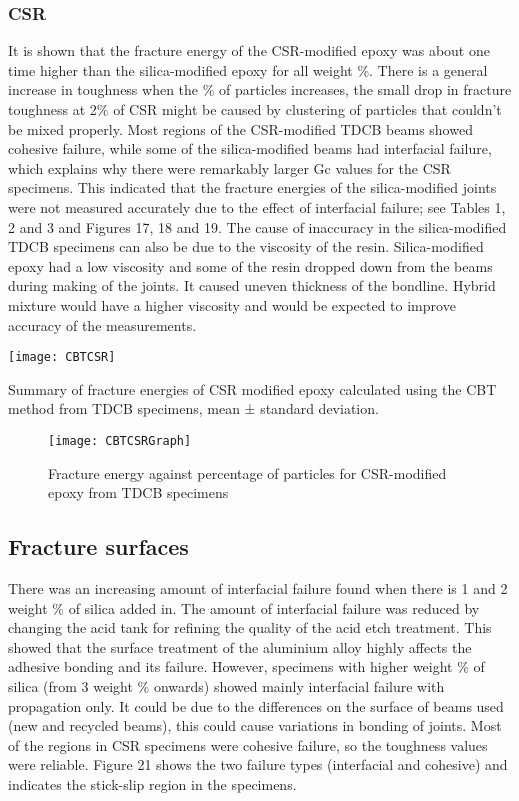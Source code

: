 \documentclass[numbers=noendperiod,chapterprefix=on]{icldt} %
\begin{document}
\subsubsection{CSR}
It is shown that the fracture energy of the CSR-modified epoxy was about one time higher than the silica-modified epoxy for all weight \%. There is a general increase in toughness when the \% of particles increases, the small drop in fracture toughness at 2\% of CSR might be caused by clustering of particles that couldn’t be mixed properly. Most regions of the CSR-modified TDCB beams showed cohesive failure, while some of the silica-modified beams had interfacial failure, which explains why there were remarkably larger Gc values for the CSR specimens. This indicated that the fracture energies of the silica-modified joints were not measured accurately due to the effect of interfacial failure; see Tables 1, 2 and 3 and Figures 17, 18 and 19.
The cause of inaccuracy in the silica-modified TDCB specimens can also be due to the viscosity of the resin. Silica-modified epoxy had a low viscosity and some of the resin dropped down from the beams during making of the joints. It caused uneven thickness of the bondline. Hybrid mixture would have a higher viscosity and would be expected to improve accuracy of the measurements.

\begin{table}[!htpb]
\centering
\texttt{[image: CBTCSR]}
\caption{Summary of fracture energies of CSR modified epoxy calculated using the CBT method from TDCB specimens, mean ± standard deviation. } %
\end{table}

\begin{figure}[!htpb]
\centering
\texttt{[image: CBTCSRGraph]}
\caption{Fracture energy against percentage of particles for CSR-modified epoxy from TDCB specimens} %
\end{figure}

\subsection{Fracture surfaces}
There was an increasing amount of interfacial failure found when there is 1 and 2 weight \% of silica added in. The amount of interfacial failure was reduced by changing the acid tank for refining the quality of the acid etch treatment. This showed that the surface treatment of the aluminium alloy highly affects the adhesive bonding and its failure. However, specimens with higher weight \% of silica (from 3 weight \% onwards) showed mainly interfacial failure with propagation only. It could be due to the differences on the surface of beams used (new and recycled beams), this could cause variations in bonding of joints. Most of the regions in CSR specimens were cohesive failure, so the toughness values were reliable. Figure 21 shows the two failure types (interfacial and cohesive) and indicates the stick-slip region in the specimens. 
\end{document}
